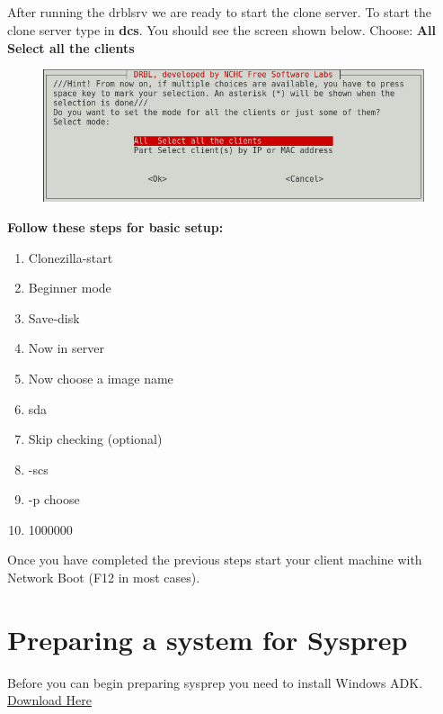 \documentclass{article}
\begin{document}
\subsection{}
\label{sec:12.4}
After running the drblsrv we are ready to start the clone server. To start the clone server type in \textbf{dcs}. You should see the screen shown below.
\newline \newline
Choose: \textbf{All Select all the clients}
\begin{figure}[h]
	\centering
	\includegraphics[width=1\linewidth]{"Screenshots-clone-server/Screenshot from 2018-03-10 13-51-18"}
\end{figure}
\newline
\textbf{Follow these steps for basic setup:}
\begin{enumerate}
	\item Clonezilla-start
	\item Beginner mode
	\item Save-disk
	\item Now in server
	\item Now choose a image name
	\item sda
	\item Skip checking (optional)
	\item -scs
	\item -p choose
	\item 1000000
\end{enumerate}
Once you have completed the previous steps start your client machine with Network Boot (F12 in most cases).
\newpage
\section{Preparing a system for Sysprep}
Before you can begin preparing sysprep you need to install Windows ADK. \href{https://go.microsoft.com/fwlink/p/?linkid=859206}{Download Here}
\end{document}
